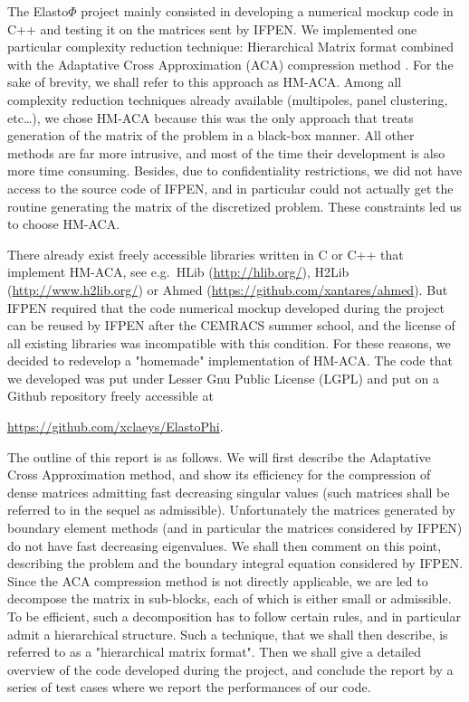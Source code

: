 \bigskip
The Elasto$\Phi$ project mainly consisted in developing a numerical mockup code in C++ and testing it on the matrices sent 
by IFPEN. We implemented one particular complexity reduction technique: Hierarchical Matrix \cite{Hackbusch2016} format combined with the Adaptative Cross 
Approximation (ACA) compression method \cite{Bebendorf2008}. For the sake of brevity, we shall refer to this approach as HM-ACA. 
Among all complexity reduction techniques 
already available (multipoles, panel clustering, etc\dots), we chose HM-ACA because this was the only approach that treats generation 
of the matrix of the problem in a black-box manner. All other methods are far more intrusive, and most of the time their development 
is also more time consuming. Besides, due to confidentiality restrictions, we did not have access to the source code of IFPEN, and 
in particular could not actually get the routine generating the matrix of the discretized problem. These constraints led us to choose HM-ACA.

\bigskip
There already exist freely accessible libraries written in C or C++ that implement HM-ACA, see e.g.~HLib (\url{http://hlib.org/}), H2Lib 
(\url{http://www.h2lib.org/}) or Ahmed (\url{https://github.com/xantares/ahmed}). But IFPEN required 
that the code numerical mockup developed during the project can be reused by IFPEN after the CEMRACS summer school, 
and the license of all existing libraries was incompatible with this condition. For these reasons, we decided to redevelop 
a "homemade" implementation of HM-ACA. The code that we developed was put under Lesser Gnu Public License (LGPL) and 
put on a Github repository freely accessible at
\begin{center}
\url{https://github.com/xclaeys/ElastoPhi}.
\end{center}

\medskip
The outline of this report is as follows. We will first describe the Adaptative Cross Approximation method, and show its efficiency 
for the compression of dense matrices admitting fast decreasing singular values (such matrices shall be referred to in the sequel as admissible). 
Unfortunately the matrices generated by boundary element  methods (and in particular the matrices considered by IFPEN) do not have 
fast decreasing eigenvalues. We shall then comment on this point, describing the problem and the boundary integral equation 
considered by IFPEN. Since the ACA compression method is not directly applicable, we are led to decompose the matrix in sub-blocks, 
each of which is either small or admissible. To be efficient, such a decomposition has to follow certain rules, and in particular 
admit a hierarchical structure. Such a technique, that we shall then describe, is referred to as a "hierarchical matrix format". 
Then we shall give a detailed overview of the code developed during the project, and conclude the report by a series of test 
cases where we report the performances of our code.

